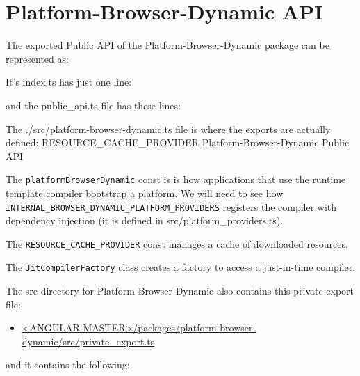 \section{Platform-Browser-Dynamic API}

The exported Public API of the Platform-Browser-Dynamic package can be represented
as:

It’s index.ts has just one line:



and the public\_api.ts file has these lines:



The ./src/platform-browser-dynamic.ts file is where the exports are actually defined:
RESOURCE\_CACHE\_PROVIDER
Platform-Browser-Dynamic Public API



The
\texttt{platformBrowserDynamic}
const is is how applications that use the runtime
template compiler bootstrap a platform. We will need to see how
\texttt{INTERNAL\_BROWSER\_DYNAMIC\_PLATFORM\_PROVIDERS}
registers the compiler with
dependency injection (it is defined in src/platform\_providers.ts).

The
\texttt{RESOURCE\_CACHE\_PROVIDER}
const manages a cache of downloaded resources.

The
\texttt{JitCompilerFactory}
class creates a factory to access a just-in-time compiler.

The src directory for Platform-Browser-Dynamic also contains this private export file:

\begin{itemize}
  \item \href{https://github.com/angular/angular/blob/master/packages/platform-browser-dynamic/src/private_export.ts}
        {<ANGULAR-MASTER>/packages/platform-browser-dynamic/src/private\_export.ts}
\end{itemize}

and it contains the following:


